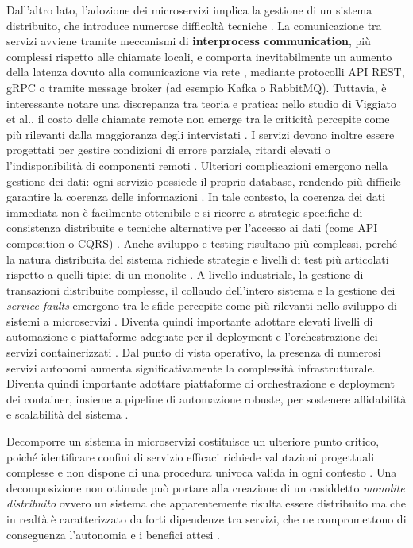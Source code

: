 Dall'altro lato, l'adozione dei microservizi implica la gestione di un sistema distribuito, che introduce numerose difficoltà tecniche \cite{Soldani2018PainsGains, Richardson2018}. 
La comunicazione tra servizi avviene tramite meccanismi di \textbf{interprocess communication}, più complessi rispetto alle chiamate locali, e comporta inevitabilmente un aumento della latenza dovuto alla comunicazione via rete \cite{Soldani2018PainsGains, Dragoni2017}, mediante protocolli API REST, gRPC o tramite message broker (ad esempio Kafka o RabbitMQ). Tuttavia, è interessante notare una discrepanza tra teoria e pratica: nello studio di Viggiato et al., il costo delle chiamate remote non emerge tra le criticità percepite come più rilevanti dalla maggioranza degli intervistati \cite{Viggiato2018Microservices}. I servizi devono inoltre essere progettati per gestire condizioni di errore parziale, ritardi elevati o l'indisponibilità di componenti remoti \cite{Richardson2018}. Ulteriori complicazioni emergono nella gestione dei dati: ogni servizio possiede il proprio database, rendendo più difficile garantire la coerenza delle informazioni \cite{Soldani2018PainsGains, Richardson2018}. In tale contesto, la coerenza dei dati immediata non è facilmente ottenibile e si ricorre a strategie specifiche di consistenza distribuite e tecniche alternative per l'accesso ai dati (come API composition o CQRS) \cite{Richardson2018}.
Anche sviluppo e testing risultano più complessi, perché la natura distribuita del sistema richiede strategie e livelli di test più articolati rispetto a quelli tipici di un monolite \cite{Richardson2018}. A livello industriale, la gestione di transazioni distribuite complesse, il collaudo dell’intero sistema e la gestione dei \textit{service faults} emergono tra le sfide percepite come più rilevanti nello sviluppo di sistemi a microservizi \cite{Viggiato2018Microservices}. Diventa quindi importante adottare elevati livelli di automazione e piattaforme adeguate per il deployment e l’orchestrazione dei servizi containerizzati \cite{Richardson2018}.
Dal punto di vista operativo, la presenza di numerosi servizi autonomi aumenta significativamente la complessità infrastrutturale. Diventa quindi importante adottare piattaforme di orchestrazione e deployment dei container, insieme a pipeline di automazione robuste, per sostenere affidabilità e scalabilità del sistema \cite{Richardson2018}.

Decomporre un sistema in microservizi costituisce un ulteriore punto critico, poiché identificare confini di servizio efficaci richiede valutazioni progettuali complesse e non dispone di una procedura univoca valida in ogni contesto \cite{Richardson2018}. Una decomposizione non ottimale può portare alla creazione di un cosiddetto \textit{monolite distribuito} ovvero un sistema che apparentemente risulta essere distribuito ma che in realtà è caratterizzato da forti dipendenze tra servizi, che ne compromettono di conseguenza l'autonomia e i benefici attesi \cite{Richardson2018}.

